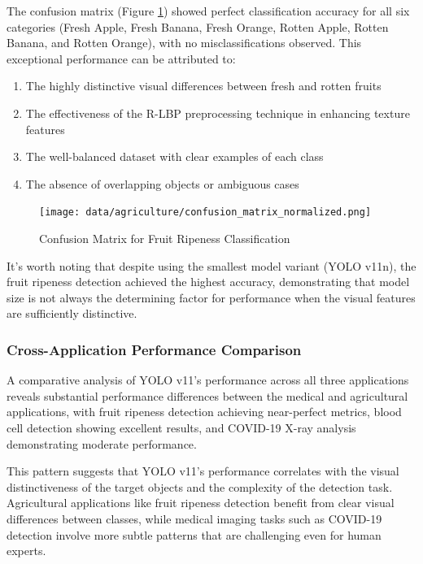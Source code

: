\begin{multicols}{2}
The confusion matrix (Figure \ref{fig:fruit_confusion}) showed perfect classification accuracy for all six categories (Fresh Apple, Fresh Banana, Fresh Orange, Rotten Apple, Rotten Banana, and Rotten Orange), with no misclassifications observed. This exceptional performance can be attributed to:

\begin{enumerate}
    \item The highly distinctive visual differences between fresh and rotten fruits
    \item The effectiveness of the R-LBP preprocessing technique in enhancing texture features
    \item The well-balanced dataset with clear examples of each class
    \item The absence of overlapping objects or ambiguous cases
\end{enumerate}

\begin{figure}[h]
\centering
\texttt{[image: data/agriculture/confusion\_matrix\_normalized.png]}
\caption{Confusion Matrix for Fruit Ripeness Classification}
\label{fig:fruit_confusion}
\end{figure}

It's worth noting that despite using the smallest model variant (YOLO v11n), the fruit ripeness detection achieved the highest accuracy, demonstrating that model size is not always the determining factor for performance when the visual features are sufficiently distinctive.

\subsubsection{Cross-Application Performance Comparison}

A comparative analysis of YOLO v11's performance across all three applications reveals substantial performance differences between the medical and agricultural applications, with fruit ripeness detection achieving near-perfect metrics, blood cell detection showing excellent results, and COVID-19 X-ray analysis demonstrating moderate performance.

This pattern suggests that YOLO v11's performance correlates with the visual distinctiveness of the target objects and the complexity of the detection task. Agricultural applications like fruit ripeness detection benefit from clear visual differences between classes, while medical imaging tasks such as COVID-19 detection involve more subtle patterns that are challenging even for human experts.


\end{multicols}
